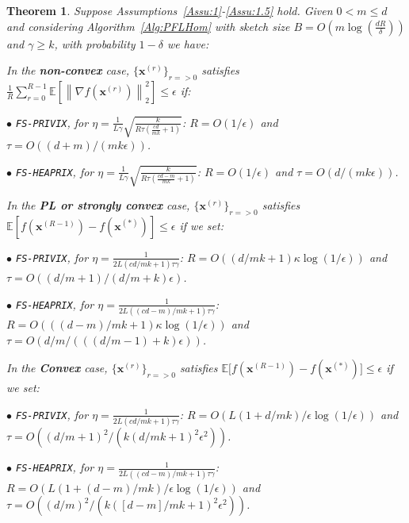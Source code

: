 \documentclass[11pt]{article}
\newtheorem{theorem}{Theorem}
\begin{document}
\begin{theorem}\label{thm:homog_case}
Suppose Assumptions~\ref{Assu:1}-\ref{Assu:1.5} hold. 
Given $0<m\leq d$ and considering Algorithm~\ref{Alg:PFLHom} with sketch size $B=O\left(m\log\left(\frac{d R}{\delta}\right)\right)$ and $\gamma\geq k$, with probability $1-\delta$ we have: 

In the \textbf{non-convex} case, $\{ {\boldsymbol{x}}^{(r)}\}_{r=>0}$ satisfies  $\frac{1}{R}\sum_{r=0}^{R-1}\mathbb{E}\left[\left\|\nabla f({\boldsymbol{x}}^{(r)})\right\|_2^2\right]\leq {\epsilon}$ if: 
 
\noindent $\bullet$ \texttt{FS-PRIVIX}, for $\eta=\frac{1}{L\gamma}\sqrt{\frac{k}{R\tau\left(\frac{c d}{m k}+1\right)}}$: $R=O\left(1/\epsilon\right)$ and $\tau=O\left(( d+m)/(mk\epsilon)\right)$.

\noindent $\bullet$ \texttt{FS-HEAPRIX}, for $\eta=\frac{1}{L\gamma}\sqrt{\frac{k}{R\tau\left(\frac{cd-m}{mk}+1\right)}}$: $R=O\left(1/\epsilon\right)$ and $\tau=O\left(d/(mk\epsilon)\right)$.

In the \textbf{PL or strongly convex} case, $\{ {\boldsymbol{x}}^{(r)}\}_{r=>0}$ satisfies $\mathbb{E}[f({\boldsymbol{x}}^{(R-1)})-f({\boldsymbol{x}}^{(*)})]\leq \epsilon$ if  we set:  

\noindent $\bullet$ \texttt{FS-PRIVIX}, for $\eta=\frac{1}{2L(cd/mk+1)\tau\gamma}$: $R=O\left(\left(d/mk+1\right)\kappa\log\left(1/\epsilon\right)\right)$ and $\tau=O\left((d/m+1)\Big/\left(d/m+k\right)\epsilon\right)$.

\noindent $\bullet$ \texttt{FS-HEAPRIX}, for $\eta=\frac{1}{2L\left((cd-m)/mk+1\right)\tau\gamma}$: $R = O\left(\left((d-m)/mk+1\right)\kappa\log\left(1/\epsilon\right)\right)$ and $ \tau =O\left(d/m\Big/\left(\left((d/m-1)+k\right)\epsilon\right)\right)$.


In the \textbf{Convex} case, $\{ {\boldsymbol{x}}^{(r)}\}_{r=>0}$ satisfies $ \mathbb{E}\Big[f({\boldsymbol{x}}^{(R-1)})-f({\boldsymbol{x}}^{(*)})\Big]\leq \epsilon$ if we set:  

\noindent $\bullet$ \texttt{FS-PRIVIX}, for $\eta=\frac{1}{2L(cd/mk+1)\tau\gamma}$: $R =O\left(L\left(1+d/mk\right)/\epsilon\log\left(1/\epsilon \right)\right)$ and
$\tau=O\left(\left(d/m+1\right)^2/(k\left(d/m k+1\right)^2\epsilon^2)\right)$.

\noindent $\bullet$ \texttt{FS-HEAPRIX}, for $\eta=\frac{1}{2L\left((cd-m)/mk+1\right)\tau\gamma}$:   $R =O\left(L\left(1+(d-m)/mk\right)/\epsilon\log\left(1/\epsilon \right)\right)$ and $\tau=O\left((d/m)^2/\left(k\left([d-m]/mk+1\right)^2\epsilon^2\right)\right)$.
\end{theorem}
\end{document}
